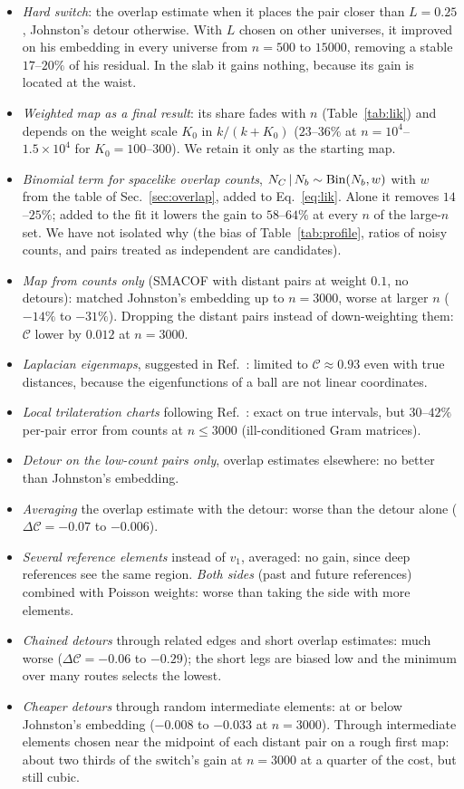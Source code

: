 \documentclass[prd,twocolumn,superscriptaddress,nofootinbib,amsmath,amssymb,floatfix]{revtex4-2}
\begin{document}
\begin{itemize}
\item \emph{Hard switch}: the overlap estimate when it places the pair closer than $L=0.25$, Johnston's detour otherwise. With $L$ chosen on other universes, it improved on his embedding in every universe from $n=500$ to $15000$, removing a stable $17$--$20\%$ of his residual. In the slab it gains nothing, because its gain is located at the waist.
\item \emph{Weighted map as a final result}: its share fades with $n$ (Table~\ref{tab:lik}) and depends on the weight scale $K_0$ in $k/(k+K_0)$ ($23$--$36\%$ at $n=10^4$--$1.5\times10^4$ for $K_0=100$--$300$). We retain it only as the starting map.
\item \emph{Binomial term for spacelike overlap counts}, $N_C\,|\,N_b\sim{\rm Bin}(N_b,w)$ with $w$ from the table of Sec.~\ref{sec:overlap}, added to Eq.~\eqref{eq:lik}. Alone it removes $14$--$25\%$; added to the fit it lowers the gain to $58$--$64\%$ at every $n$ of the large-$n$ set. We have not isolated why (the bias of Table~\ref{tab:profile}, ratios of noisy counts, and pairs treated as independent are candidates).
\item \emph{Map from counts only} (SMACOF with distant pairs at weight $0.1$, no detours): matched Johnston's embedding up to $n=3000$, worse at larger $n$ ($-14\%$ to $-31\%$). Dropping the distant pairs instead of down-weighting them: $\mathcal C$ lower by $0.012$ at $n=3000$.
\item \emph{Laplacian eigenmaps}, suggested in Ref.~\cite{BK24}: limited to $\mathcal C\approx0.93$ even with true distances, because the eigenfunctions of a ball are not linear coordinates.
\item \emph{Local trilateration charts} following Ref.~\cite{Madsen26}: exact on true intervals, but $30$--$42\%$ per-pair error from counts at $n\le3000$ (ill-conditioned Gram matrices).
\item \emph{Detour on the low-count pairs only}, overlap estimates elsewhere: no better than Johnston's embedding.
\item \emph{Averaging} the overlap estimate with the detour: worse than the detour alone ($\Delta\mathcal C=-0.07$ to $-0.006$).
\item \emph{Several reference elements} instead of $v_1$, averaged: no gain, since deep references see the same region. \emph{Both sides} (past and future references) combined with Poisson weights: worse than taking the side with more elements.
\item \emph{Chained detours} through related edges and short overlap estimates: much worse ($\Delta\mathcal C=-0.06$ to $-0.29$); the short legs are biased low and the minimum over many routes selects the lowest.
\item \emph{Cheaper detours} through random intermediate elements: at or below Johnston's embedding ($-0.008$ to $-0.033$ at $n=3000$). Through intermediate elements chosen near the midpoint of each distant pair on a rough first map: about two thirds of the switch's gain at $n=3000$ at a quarter of the cost, but still cubic.
\end{itemize}
\end{document}
